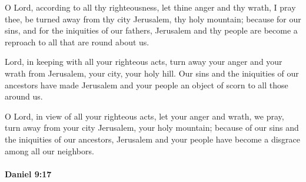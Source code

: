 			\begin{versebox}
					\item[BHS] 
					\item[LXX] 
					\item[ASV] O Lord, according to all thy righteousness, let thine anger and thy wrath, I pray thee, be turned away from thy city Jerusalem, thy holy mountain; because for our sins, and for the iniquities of our fathers, Jerusalem and thy people are become a reproach to all that are round about us.
					\item[NIV] Lord, in keeping with all your righteous acts, turn away your anger and your wrath from Jerusalem, your city, your holy hill. Our sins and the iniquities of our ancestors have made Jerusalem and your people an object of scorn to all those around us.
					\item[NRSV] O Lord, in view of all your righteous acts, let your anger and wrath, we pray, turn away from your city Jerusalem, your holy mountain; because of our sins and the iniquities of our ancestors, Jerusalem and your people have become a disgrace among all our neighbors.
			\end{versebox}

		\paragraph{Daniel 9:17} %
			\label{DANIEL-9-17}


